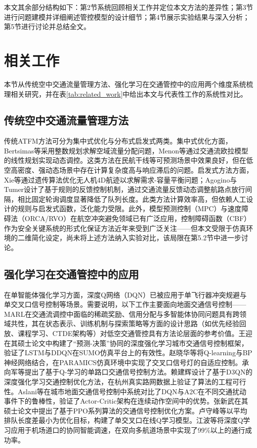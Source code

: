 \documentclass[12pt,a4paper,UTF8]{ctexart}
\begin{document}
本文其余部分结构如下：第2节系统回顾相关工作并定位本文方法的差异性；第3节进行问题建模并详细阐述管控模型的设计细节；第4节展示实验结果与深入分析；第5节进行讨论并总结全文。

\section{相关工作}

本节从传统空中交通流量管理方法、强化学习在交通管控中的应用两个维度系统梳理相关研究，并在表\ref{tab:related_work}中给出本文与代表性工作的系统性对比。

\subsection{传统空中交通流量管理方法}

传统ATFM方法可分为集中式优化与分布式启发式两类。集中式优化方面，Bertsimas等采用整数规划求解空域流量分配问题，Menon等通过交通流欧拉模型的线性规划实现动态调控\cite{ref6}。这类方法在民航干线等可预测场景中效果良好，但在低空高密度、强动态场景中存在计算复杂度高与响应滞后的问题。启发式方法方面，Xie等通过遗传算法优化无人机4D航迹以求解需求-容量平衡问题\cite{ref6}；Agogino与Tumer设计了基于规则的反馈控制机制，通过交通流量反馈动态调整航路点放行间隔，相比固定轮询调度显著降低了队列长度\cite{ref4}。此类方法计算效率高，但依赖人工设计的规则与启发式函数，泛化能力受限。此外，模型预测控制（MPC）与速度障碍法（ORCA/RVO）\cite{ref22}在航空冲突避免领域已有广泛应用，控制障碍函数（CBF）\cite{ref23}作为安全关键系统的形式化保证方法近年来受到广泛关注——但本文受限于仿真环境的二维简化设定，尚未将上述方法纳入实验对比，该局限在第5.2节中进一步讨论。

\subsection{强化学习在交通管控中的应用}

在单智能体强化学习方面，深度Q网络（DQN）已被应用于单飞行器冲突规避与单交叉口信号控制等场景。需要说明，以下工作主要面向地面交通信号控制——MARL在交通流调控中面临的稀疏奖励、信用分配与多智能体协同问题具有跨领域共性，其在状态表示、训练机制与探索策略等方面的设计思路（如优先经验回放、课程学习、CTDE架构等）对低空交通管控具有方法论层面的参考价值。王迎在其硕士论文中构建了``预测-决策''协同的深度强化学习城市交通信号控制框架，验证了LSTM与DDQN在SUMO仿真平台上的有效性\cite{ref13}。赵晓华等将Q-learning与BP神经网络结合，在PARAMICS仿真环境中实现了交叉口信号灯的自适应控制\cite{ref14}。承向军等提出了基于Q-学习的单路口交通信号控制方法\cite{ref15}。赖建辉设计了基于D3QN的深度强化学习交通控制优化方法，在杭州真实路网数据上验证了算法的工程可行性\cite{ref16}。Aslani等在城市地面交通信号控制中系统对比了DQN与A2C在不同交通扰动事件下的鲁棒性，验证了Actor-Critic架构在连续动作空间中的优势\cite{ref10}。张新武在其硕士论文中提出了基于PPO系列算法的交通信号控制优化方案\cite{ref17}。卢守峰等以平均排队长度差最小为优化目标，构建了单交叉口在线Q学习模型\cite{ref18}。江波等将深度Q学习应用于机场道口的协同智能调速，在双向多航道场景中实现了99\%以上的通行成功率\cite{ref19}。
\end{document}
